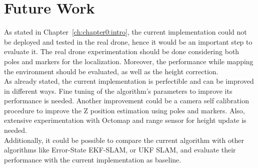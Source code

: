 \section{Future Work}
As stated in Chapter~\ref{ch:chapter0:intro}, the current implementation could not be deployed and tested in the real drone, hence it would be an important step to evaluate it. The real drone experimentation should be done considering both poles and markers for the localization. Moreover, the performance while mapping the environment should be evaluated, as well as the height correction.\\

As already stated, the current implementation is perfectible and can be improved in different ways. Fine tuning of the algorithm's parameters to improve its performance is needed. Another improvement could be a camera self calibration procedure to improve the Z position estimation using poles and markers. Also, extensive experimentation with Octomap and range sensor for height update is needed.\\

Additionally, it could be possible to compare the current algorithm with other algorithms like Error-State EKF-SLAM, or \ac{UKF} SLAM, and evaluate their performance with the current implementation as baseline.

